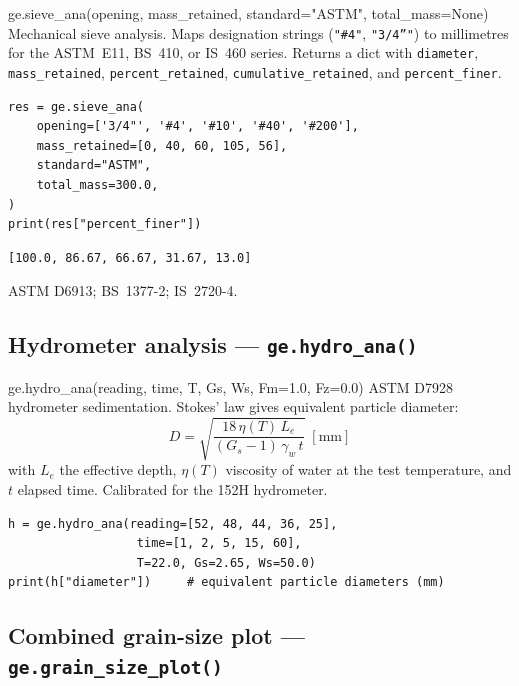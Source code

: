 \documentclass[11pt,a4paper,openany]{book}
\newcommand{\gammaw}{\gamma_w}
\begin{document}
\begin{funcbox}{ge.sieve\_ana(opening, mass\_retained, standard="ASTM", total\_mass=None)}
Mechanical sieve analysis. Maps designation strings
(\texttt{"\#4"}, \texttt{"3/4''"}) to millimetres for the ASTM~E11,
BS~410, or IS~460 series. Returns a dict with \texttt{diameter},
\texttt{mass\_retained}, \texttt{percent\_retained},
\texttt{cumulative\_retained}, and \texttt{percent\_finer}.
\end{funcbox}

\begin{lstlisting}
res = ge.sieve_ana(
    opening=['3/4"', '#4', '#10', '#40', '#200'],
    mass_retained=[0, 40, 60, 105, 56],
    standard="ASTM",
    total_mass=300.0,
)
print(res["percent_finer"])
\end{lstlisting}
\begin{lstlisting}[style=output]
[100.0, 86.67, 66.67, 31.67, 13.0]
\end{lstlisting}

\begin{refbox}
ASTM D6913; BS~1377-2; IS~2720-4.
\end{refbox}

\subsection{Hydrometer analysis --- \texttt{ge.hydro\_ana()}}

\begin{funcbox}{ge.hydro\_ana(reading, time, T, Gs, Ws, Fm=1.0, Fz=0.0)}
ASTM D7928 hydrometer sedimentation. Stokes' law gives equivalent
particle diameter:
\[
D = \sqrt{\frac{18\,\eta(T)\,L_e}{(G_s - 1)\,\gammaw\,t}}\;[\text{mm}]
\]
with $L_e$ the effective depth, $\eta(T)$ viscosity of water at
the test temperature, and $t$ elapsed time. Calibrated for the
152H hydrometer.
\end{funcbox}

\begin{lstlisting}
h = ge.hydro_ana(reading=[52, 48, 44, 36, 25],
                  time=[1, 2, 5, 15, 60],
                  T=22.0, Gs=2.65, Ws=50.0)
print(h["diameter"])     # equivalent particle diameters (mm)
\end{lstlisting}

\subsection{Combined grain-size plot --- \texttt{ge.grain\_size\_plot()}}
\end{document}

